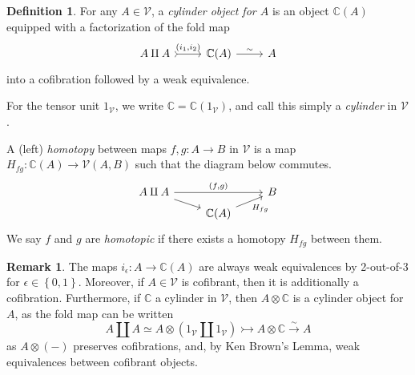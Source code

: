 \documentclass[a4paper,10pt
,draft
]{article}%
\numberwithin{equation}{section}
\numberwithin{figure}{section}
\theoremstyle{definition} %
\newtheorem{definition}[equation]{Definition}%
\newtheorem{remark}[equation]{Remark}%
\newcommand{\set}[1]{\left\{#1\right\}}%
\newcommand{\V}{\ensuremath{\mathcal V}}
\newcommand{\1}{\ensuremath{\mathbbm 1}}%
\begin{document}
\begin{definition}
      For any $A \in \V$, a \textit{cylinder object for $A$} is an object $\mathbb C(A)$ equipped with a factorization of the fold map
      \begin{equation}
            \begin{tikzcd}
                  A \amalg A \arrow[r, tail, "{(i_1,i_2)}"]
                  &
                  \mathbb C(A) \arrow[r, "\sim"]
                  &
                  A
            \end{tikzcd}
      \end{equation}
      into a cofibration followed by a weak equivalence.
      
      For the tensor unit $1_\V$, we write $\mathbb C = \mathbb C(1_\V)$, and call this simply a \textit{cylinder} in $\V$.
      
      A (left) \textit{homotopy} between maps $f,g: A \to B$ in $\V$ is a map $H_{fg}: \mathbb C(A) \to \V(A,B)$ such that
      the diagram below commutes.
      \begin{equation}
            \begin{tikzcd}[row sep = tiny]
                  A \amalg A \arrow[rr, "{(f,g)}"] \arrow[dr]
                  &&
                  B
                  \\
                  &
                  \mathbb C(A) \arrow[ur, "H_{fg}"']
            \end{tikzcd}
      \end{equation}
      We say $f$ and $g$ are \textit{homotopic} if there exists a homotopy $H_{f g}$ between them.
\end{definition}



\begin{remark}
      \label{CYL_REM}
      The maps $i_\epsilon: A \to \mathbb C(A)$ are always weak equivalences by 2-out-of-3 for $\epsilon \in \set{0,1}$.
      Moreover, if $A \in \V$ is cofibrant, then it is additionally a cofibration.
      Furthermore, if $\mathbb C$ a cylinder in $\V$,
      then $A \otimes \mathbb C$ is a cylinder object for $A$,
      as the fold map can be written
      \begin{equation}
            A \amalg A \simeq A \otimes (1_\V \amalg 1_\V) \rightarrowtail A \otimes \mathbb C \xrightarrow{\sim} A
      \end{equation}
      as $A \otimes (-)$ preserves cofibrations, and, by Ken Brown's Lemma, weak equivalences between cofibrant objects.
\end{remark}
\end{document}
